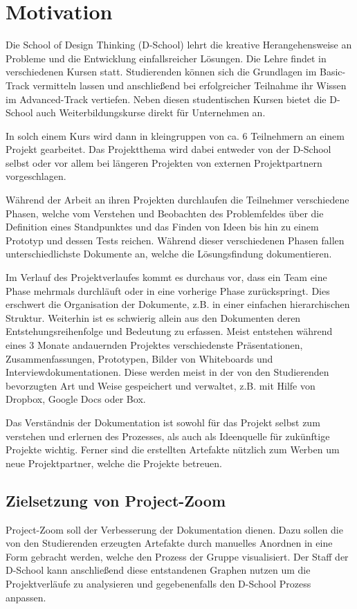 \chapter{Motivation}
\label{chap:Einleitung}

Die School of Design Thinking (D-School) lehrt die kreative Herangehensweise an Probleme und die Entwicklung einfallsreicher Lösungen. Die Lehre findet in verschiedenen Kursen statt. Studierenden können sich die Grundlagen im Basic-Track vermitteln lassen und anschließend bei erfolgreicher Teilnahme ihr Wissen im  Advanced-Track vertiefen. Neben diesen studentischen Kursen bietet die D-School auch Weiterbildungskurse direkt für Unternehmen an.

In solch einem Kurs wird dann in kleingruppen von ca. 6 Teilnehmern an einem Projekt gearbeitet. Das Projektthema wird dabei entweder von der D-School selbst oder vor allem bei längeren Projekten von externen Projektpartnern vorgeschlagen. 

Während der Arbeit an ihren Projekten durchlaufen die Teilnehmer verschiedene Phasen, welche vom Verstehen und Beobachten des Problemfeldes über die Definition eines Standpunktes und das Finden von Ideen bis hin zu einem Prototyp und dessen Tests reichen. Während dieser verschiedenen Phasen fallen unterschiedlichste Dokumente an, welche die Lösungsfindung dokumentieren.

Im Verlauf des Projektverlaufes kommt es durchaus vor, dass ein Team eine Phase mehrmals durchläuft oder in eine vorherige Phase zurückspringt. Dies erschwert die Organisation der Dokumente, z.B. in einer einfachen hierarchischen Struktur. Weiterhin ist es schwierig allein aus den Dokumenten deren Entstehungsreihenfolge und Bedeutung zu erfassen. Meist entstehen während eines 3 Monate andauernden Projektes verschiedenste Präsentationen, Zusammenfassungen, Prototypen, Bilder von Whiteboards und Interviewdokumentationen. Diese werden meist in der von den Studierenden bevorzugten Art und Weise gespeichert und verwaltet, z.B. mit Hilfe von Dropbox, Google Docs oder Box.

Das Verständnis der Dokumentation ist sowohl für das Projekt selbst zum verstehen und erlernen des Prozesses, als auch als Ideenquelle für zukünftige Projekte wichtig. Ferner sind die erstellten Artefakte nützlich zum Werben um neue Projektpartner, welche die Projekte betreuen.

\section{Zielsetzung von Project-Zoom}
Project-Zoom soll der Verbesserung der Dokumentation dienen. Dazu sollen die von den Studierenden erzeugten Artefakte durch manuelles Anordnen in eine Form gebracht werden, welche den Prozess der Gruppe visualisiert. Der Staff der D-School kann anschließend diese entstandenen Graphen nutzen um die Projektverläufe zu analysieren und gegebenenfalls den D-School Prozess anpassen.


